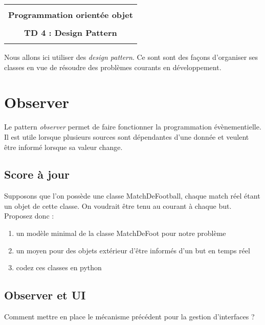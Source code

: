 \documentclass[12pt]{article}
\begin{document}
    \begin{center}
      \begin{tabular}{c}
      \hline
    \\
        {\bf \textsf {\Large Programmation orientée objet}}\\
    \\
        {\bf \textsf {\Large TD 4 : Design Pattern}}\\
    \\
        \hline
      \end{tabular}
    \end{center}
    \vspace{15mm}



Nous allons ici utiliser des {\em design pattern}. Ce sont sont des façons d'organiser ses classes en vue de résoudre des problèmes courants en développement.

\section{Observer}

Le pattern {\em observer} permet de faire fonctionner la programmation évènementielle. Il est utile lorsque plusieurs sources sont dépendantes d'une donnée et veulent être informé lorsque sa valeur change. 

\subsection{Score à jour}

Supposons que l'on possède une classe MatchDeFootball, chaque match réel étant un objet de cette classe. On voudrait être tenu au courant à chaque but. 
Proposez donc : 
\begin{enumerate}
    \item un modèle minimal de la classe MatchDeFoot pour notre problème
    \item un moyen pour des objets extérieur d'être informés d'un but en temps réel
    \item codez ces classes en python
\end{enumerate}


\subsection{Observer et UI}

Comment mettre en place le mécanisme précédent pour la gestion d'interfaces ?
\end{document}
